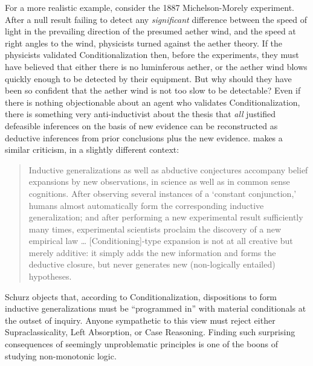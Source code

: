 For a more realistic example, consider the 1887 Michelson-Morely experiment.
After a null result failing to detect any {\em significant} difference between
the speed of light in the prevailing direction of the presumed aether wind, and
the speed at right angles to the wind, physicists turned against the aether
theory. If the physicists validated Conditionalization then, before the
experiments, they must have believed that either there is no luminferous aether,
or the aether wind blows quickly enough to be detected by their equipment. But
why should they have been so confident that the aether wind is not too slow to
be detectable? Even if there is nothing objectionable about an agent who
validates Conditionalization, there is something very anti-inductivist about the
thesis that {\em all} justified defeasible inferences on the basis of new
evidence can be reconstructed as deductive inferences from prior conclusions
plus the new evidence. \citet{schurz2011abductive} makes a similar criticism, in
a slightly different context: 
\begin{quote}
Inductive generalizations as well as abductive conjectures accompany belief
expansions by new observations, in science as well as in common sense
cognitions. After observing several instances of a `constant conjunction,’
humans almost automatically form the corresponding inductive generalization; and
after performing a new experimental result sufficiently many times, experimental
scientists proclaim the discovery of a new empirical law \ldots
[Conditioning]-type expansion is not at all creative but merely additive: it
simply adds the new information and forms the deductive closure, but never
generates new (non-logically entailed) hypotheses.
\end{quote}
Schurz objects that, according to Conditionalization, dispositions to form
inductive generalizations must be ``programmed in'' with material conditionals
at the outset of inquiry. Anyone sympathetic to this view must reject either
Supraclassicality, Left Absorption, or Case Reasoning. Finding such surprising
consequences of seemingly unproblematic principles is one of the boons  of
studying non-monotonic logic.

